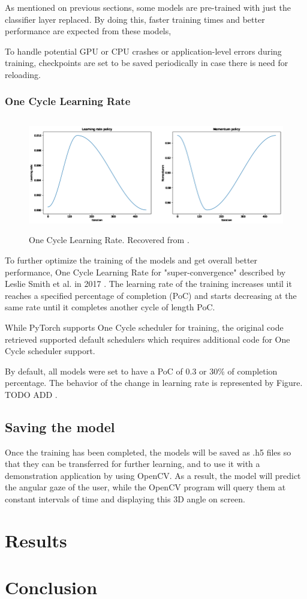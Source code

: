 As mentioned on previous sections, some models are pre-trained with just the classifier layer replaced. By doing this, faster training times and better performance are expected from these models,

To handle potential GPU or CPU crashes or application-level errors during training, checkpoints are set to be saved periodically in case there is need for reloading.   

\subsection{One Cycle Learning Rate}
\label{one-cycle}


\begin{figure}
    \centering
    \includegraphics[width=\textwidth,height=5cm]{img/figures/one-cycle.png}
    \caption[One Cycle Learning Rate]{One Cycle Learning Rate. Recovered from \cite{OneCycleFigure}. }
    \label{SampleOneCycle}
 \end{figure}

To further optimize the training of the models and get overall better performance, One Cycle Learning Rate for "super-convergence" 
described by Leslie Smith et al. in 2017 \cite{OneCycle}. The learning rate of the training increases until it reaches
a specified percentage of completion (PoC) and starts decreasing at the same rate until it completes another cycle of length
PoC.

While PyTorch supports One Cycle scheduler for training, the original code retrieved supported default schedulers which requires
additional code for One Cycle scheduler support.

By default, all models were set to have a PoC of 0.3 or 30\% of completion percentage. The behavior of the change in learning rate
is represented by Figure. TODO ADD .

\section{Saving the model}
Once the training has been completed, the models will be saved as .h5 files so that they can be transferred for further learning,
and to use it with a demonstration application by using OpenCV. As a result, the model will predict the angular gaze
of the user, while the OpenCV program will query them at constant intervals of time and displaying this 3D angle on screen.

\chapter{Results}
\label{Chap4}


\chapter{Conclusion}
\label{Chap5}
